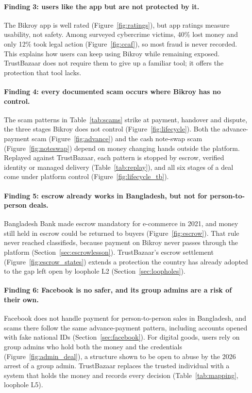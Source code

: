 \paragraph{Finding 3: users like the app but are not protected by it.}
The Bikroy app is well rated (Figure~\ref{fig:ratings}), but app ratings measure usability, not
safety. Among surveyed cybercrime victims, 40\% lost money and only 12\% took legal action
(Figure~\ref{fig:ccaf}), so most fraud is never recorded. This explains how users can keep using
Bikroy while remaining exposed. TrustBazaar does not require them to give up a familiar tool; it
offers the protection that tool lacks.

\paragraph{Finding 4: every documented scam occurs where Bikroy has no control.}
The scam patterns in Table~\ref{tab:scams} strike at payment, handover and dispute, the three
stages Bikroy does not control (Figure~\ref{fig:lifecycle}). Both the advance-payment scam
(Figure~\ref{fig:advance}) and the cash note-swap scam (Figure~\ref{fig:noteswap}) depend on
money changing hands outside the platform. Replayed against TrustBazaar, each pattern is stopped
by escrow, verified identity or managed delivery (Table~\ref{tab:replay}), and all six stages of
a deal come under platform control (Figure~\ref{fig:lifecycle_tb}).

\paragraph{Finding 5: escrow already works in Bangladesh, but not for person-to-person deals.}
Bangladesh Bank made escrow mandatory for e-commerce in 2021, and money still held in escrow
could be returned to buyers (Figure~\ref{fig:escrow}). That rule never reached classifieds,
because payment on Bikroy never passes through the platform (Section~\ref{sec:escrowlesson}).
TrustBazaar's escrow settlement (Figure~\ref{fig:escrow_states}) extends a protection the country
has already adopted to the gap left open by loophole L2 (Section~\ref{sec:loopholes}).

\paragraph{Finding 6: Facebook is no safer, and its group admins are a risk of their own.}
Facebook does not handle payment for person-to-person sales in Bangladesh, and scams there follow
the same advance-payment pattern, including accounts opened with fake national IDs
(Section~\ref{sec:facebook}). For digital goods, users rely on group admins who hold both the
money and the credentials (Figure~\ref{fig:admin_deal}), a structure shown to be open to abuse by
the 2026 arrest of a group admin. TrustBazaar replaces the trusted individual with a system that
holds the money and records every decision (Table~\ref{tab:mapping}, loophole L5).

